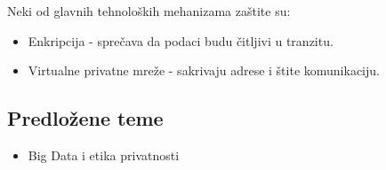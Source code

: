 \documentclass[12pt]{article}
\begin{document}
Neki od glavnih tehnoloških mehanizama zaštite su:
\begin{itemize}
  \item Enkripcija -  sprečava da podaci budu čitljivi u tranzitu.
  \item Virtualne privatne mreže -  sakrivaju adrese i štite komunikaciju.
\end{itemize}

\subsection{Predložene teme}
\begin{itemize}
  \item Big Data i etika privatnosti
\end{itemize}
\end{document}
